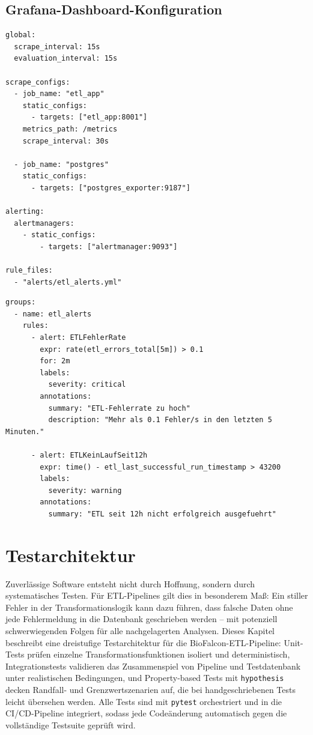 \documentclass[12pt,a4paper]{report}
\theoremstyle{definition}
\theoremstyle{remark}
\newcommand{\code}[1]{\texttt{#1}}
\begin{document}
\section{Grafana-Dashboard-Konfiguration}

\begin{lstlisting}[style=yaml, caption={monitoring/prometheus.yml: Scrape-Konfiguration}]
global:
  scrape_interval: 15s
  evaluation_interval: 15s

scrape_configs:
  - job_name: "etl_app"
    static_configs:
      - targets: ["etl_app:8001"]
    metrics_path: /metrics
    scrape_interval: 30s

  - job_name: "postgres"
    static_configs:
      - targets: ["postgres_exporter:9187"]

alerting:
  alertmanagers:
    - static_configs:
        - targets: ["alertmanager:9093"]

rule_files:
  - "alerts/etl_alerts.yml"
\end{lstlisting}

\begin{lstlisting}[style=yaml, caption={alerts/etl\_alerts.yml: Alerting-Regeln}]
groups:
  - name: etl_alerts
    rules:
      - alert: ETLFehlerRate
        expr: rate(etl_errors_total[5m]) > 0.1
        for: 2m
        labels:
          severity: critical
        annotations:
          summary: "ETL-Fehlerrate zu hoch"
          description: "Mehr als 0.1 Fehler/s in den letzten 5 Minuten."

      - alert: ETLKeinLaufSeit12h
        expr: time() - etl_last_successful_run_timestamp > 43200
        labels:
          severity: warning
        annotations:
          summary: "ETL seit 12h nicht erfolgreich ausgefuehrt"
\end{lstlisting}

\chapter{Testarchitektur}
\label{sec:testing}

Zuverlässige Software entsteht nicht durch Hoffnung, sondern durch systematisches Testen. Für ETL-Pipelines gilt dies in besonderem Maß: Ein stiller Fehler in der Transformationslogik kann dazu führen, dass falsche Daten ohne jede Fehlermeldung in die Datenbank geschrieben werden -- mit potenziell schwerwiegenden Folgen für alle nachgelagerten Analysen. Dieses Kapitel beschreibt eine dreistufige Testarchitektur für die BioFalcon-ETL-Pipeline: Unit-Tests prüfen einzelne Transformationsfunktionen isoliert und deterministisch, Integrationstests validieren das Zusammenspiel von Pipeline und Testdatenbank unter realistischen Bedingungen, und Property-based Tests mit \code{hypothesis} decken Randfall- und Grenzwertszenarien auf, die bei handgeschriebenen Tests leicht übersehen werden. Alle Tests sind mit \code{pytest} orchestriert und in die CI/CD-Pipeline integriert, sodass jede Codeänderung automatisch gegen die vollständige Testsuite geprüft wird.
\end{document}
